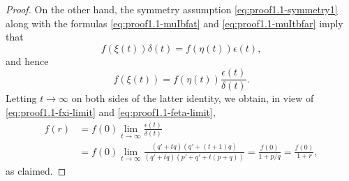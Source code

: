 \documentclass[10pt]{article}
\theoremstyle{definition}
\numberwithin{equation}{section}
\numberwithin{lemma}{section}
\begin{document}
\begin{proof}
On the other hand, the symmetry assumption \eqref{eq:proof1.1-symmetry1}
along with the formulas \eqref{eq:proof1.1-muIbfat}
and \eqref{eq:proof1.1-muItbfar} imply that 
\begin{equation*}
f(\xi(t)) \delta(t)= f(\eta(t))\epsilon(t),
\end{equation*}
and hence 
\begin{equation*}
f(\xi(t))=f(\eta(t))\frac{\epsilon(t)}{\delta(t)}.
\end{equation*}
Letting $t\to\infty$ on both sides of the latter identity, we obtain, in
view of \eqref{eq:proof1.1-fxi-limit} and
\eqref{eq:proof1.1-feta-limit}, 
\begin{align*}
f(r)&=f(0)\lim_{t\to\infty}\frac{\epsilon(t)}{\delta(t)}
\\
&=f(0)\lim_{t\to\infty}
\frac{(q'+tq)(q'+(t+1)q)}
{(q'+tq)(p'+q'+t(p+q))}
=\frac{f(0)}{1+p/q}=\frac{f(0)}{1+r},
\end{align*}
as claimed.
\end{proof}
\end{document}
